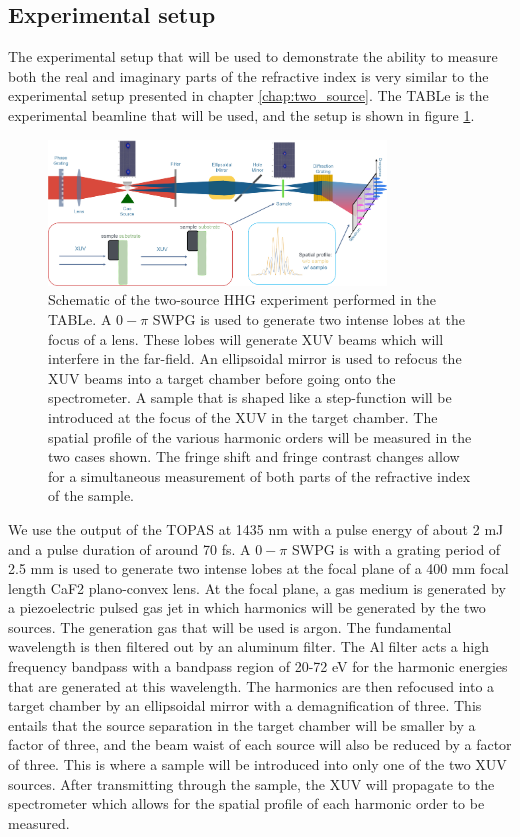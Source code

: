\subsection{Experimental setup}
\label{sec:experimental_setup_refrac}
The experimental setup that will be used to demonstrate the ability to measure both the real and imaginary parts of the refractive index is very similar to the experimental setup presented in chapter \ref{chap:two_source}.  The TABLe is the experimental beamline that will be used, and the setup is shown in figure \ref{fig:refract_schematic}.
\begin{figure}
	\centering
	\includegraphics[width=0.8\textwidth]{figures/refractive_index/experimental_setup.png}
	\caption[Schematic of using two-source HHG to measure the real and imaginary part of the refractive index]{Schematic of the two-source HHG experiment performed in the TABLe. A $0-\pi$ SWPG is used to generate two intense lobes at the focus of a lens.  These lobes will generate XUV beams which will interfere in the far-field.  An ellipsoidal mirror is used to refocus the XUV beams into a target chamber before going onto the spectrometer. A sample that is shaped like a step-function will be introduced at the focus of the XUV in the target chamber.  The spatial profile of the various harmonic orders will be measured in the two cases shown.  The fringe shift and fringe contrast changes allow for a simultaneous measurement of both parts of the refractive index of the sample.}
	\label{fig:refract_schematic}
\end{figure}
We use the output of the TOPAS at 1435 nm with a pulse energy of about 2 mJ and a pulse duration of around 70 fs. A $0-\pi$ SWPG is with a grating period of 2.5 mm is used to generate two intense lobes at the focal plane of a 400 mm focal length CaF2 plano-convex lens. At the focal plane, a gas medium is generated by a piezoelectric pulsed gas jet in which harmonics will be generated by the two sources.  The generation gas that will be used is argon. The fundamental wavelength is then filtered out by an aluminum filter.  The Al filter acts a high frequency bandpass with a bandpass region of 20-72 eV for the harmonic energies that are generated at this wavelength.  The harmonics are then refocused into a target chamber by an ellipsoidal mirror with a demagnification of three.  This entails that the source separation in the target chamber will be smaller by a factor of three, and the beam waist of each source will also be reduced by a factor of three.  This is where a sample will be introduced into only one of the two XUV sources.  After transmitting through the sample, the XUV will propagate to the spectrometer which allows for the spatial profile of each harmonic order to be measured.

